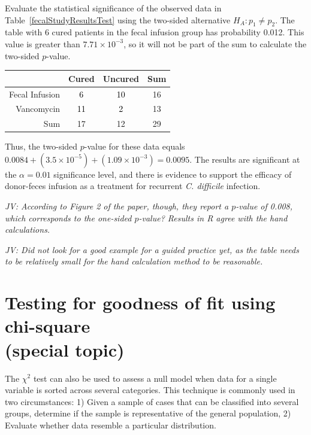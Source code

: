 \begin{example}{Evaluate the statistical significance of the observed data in Table~\ref{fecalStudyResultsTest} using the two-sided alternative $H_A: p_1 \neq p_2$.}
The table with 6 cured patients in the fecal infusion group has probability 0.012. This value is greater than $7.71 \times 10^{-3}$, so it will not be part of the sum to calculate the two-sided $p$-value.
	
\begin{table}[h]
	\centering
	\color{gray}
	\begin{tabular}{r|cc|c}
		\hline
		& Cured & Uncured & Sum \\ 
		\hline
		Fecal Infusion & \textcolor{black}{6} & \textcolor{black}{10} & 16 \\ 
		Vancomycin & \textcolor{black}{11} & \textcolor{black}{2} & 13 \\ 
		\hline
		Sum & 17 & 12 & 29 \\ 
		\hline
	\end{tabular}
\end{table}	

Thus, the two-sided $p$-value for these data equals $0.0084 + (3.5 \times 10^{-5}) + (1.09 \times 10^{-3}) = 0.0095$. The results are significant at the $\alpha = 0.01$ significance level, and there is evidence to support the efficacy of donor-feces infusion as a treatment for recurrent \textit{C. difficile} infection.

\textit{JV: According to Figure 2 of the paper, though, they report a $p$-value of 0.008, which corresponds to the one-sided $p$-value? Results in R agree with the hand calculations.}
	
\end{example}

\textit{JV: Did not look for a good example for a guided practice yet, as the table needs to be relatively small for the hand calculation method to be reasonable.}

\section[Testing for goodness of fit using chi-square (special topic)]{Testing for goodness of fit using chi-square \\(special topic)}
\label{oneWayChiSquare}

The $\chi^2$ test can also be used to assess a null model when data for a single variable is sorted across several categories. This technique is commonly used in two circumstances: 1) Given a sample of cases that can be classified into several groups, determine if the sample is representative of the general population, 2) Evaluate whether data resemble a particular distribution. 

